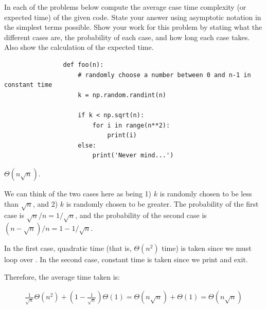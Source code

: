 \begin{prob}
    In each of the problems below compute the average case time complexity (or
    expected time) of the given code. State your answer using asymptotic
    notation in the simplest terms possible. Show your work for this problem by stating what the different
    cases are, the probability of each case, and how long each case takes. Also
    show the calculation of the expected time.

    \begin{subprobset}
        \begin{subprob}
            \begin{verbatim}
                def foo(n):
                    # randomly choose a number between 0 and n-1 in constant time
                    k = np.random.randint(n)

                    if k < np.sqrt(n):
                        for i in range(n**2):
                            print(i)
                    else:
                        print('Never mind...')

            \end{verbatim}

            \begin{soln}
                $\Theta(n\sqrt{n})$.

                We can think of the two cases here as being 1) $k$ is randomly chosen
                to be less than $\sqrt{n}$, and 2) $k$ is randomly chosen to be greater.
                The probability of the first case is $\sqrt{n} / n = 1/\sqrt{n}$, and
                the probability of the second case is $(n - \sqrt{n})/n = 1 - 1/\sqrt{n}$.

                In the first case, quadratic time (that is, $\Theta(n^2)$ time)
                is taken since we must loop over . In the
                second case, constant time is taken since we print
                 and exit.

                Therefore, the average time taken is:

                \begin{align*}
                    \frac{1}{\sqrt{n}} \Theta(n^2) + \left(1 - \frac{1}{\sqrt{n}}\right) \Theta(1)
                    =
                        \Theta(n\sqrt{n}) + \Theta(1)
                    =
                        \Theta(n\sqrt{n})
                \end{align*}


\end{soln}
\end{subprob}
\end{subprobset}
\end{prob}
